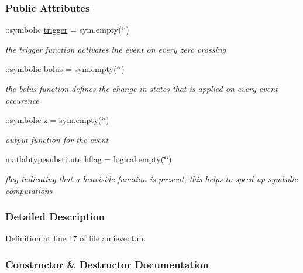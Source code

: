 \subsubsection*{Public Attributes}
\begin{DoxyCompactItemize}
\item 
\+::symbolic \hyperlink{classamievent_ae194cb817eae4085f8023885100c68dd}{trigger} = sym.\+empty(\char`\"{}\char`\"{})
\begin{DoxyCompactList}\small\item\em the trigger function activates the event on every zero crossing \end{DoxyCompactList}\item 
\+::symbolic \hyperlink{classamievent_ab9227561ac246ee4b70f9e65c25ffda7}{bolus} = sym.\+empty(\char`\"{}\char`\"{})
\begin{DoxyCompactList}\small\item\em the bolus function defines the change in states that is applied on every event occurence \end{DoxyCompactList}\item 
\+::symbolic \hyperlink{classamievent_a25ed1bcb423b0b7200f485fc5ff71c8e}{z} = sym.\+empty(\char`\"{}\char`\"{})
\begin{DoxyCompactList}\small\item\em output function for the event \end{DoxyCompactList}\item 
matlabtypesubstitute \hyperlink{classamievent_ab98347b5ce6fbe7bd007030346b88575}{hflag} = logical.\+empty(\char`\"{}\char`\"{})
\begin{DoxyCompactList}\small\item\em flag indicating that a heaviside function is present, this helps to speed up symbolic computations \end{DoxyCompactList}\end{DoxyCompactItemize}


\subsubsection{Detailed Description}


Definition at line 17 of file amievent.\+m.



\subsubsection{Constructor \& Destructor Documentation}
\hypertarget{classamievent_a64b7d5a2d9dc65a982f1f9812949b865}{}
